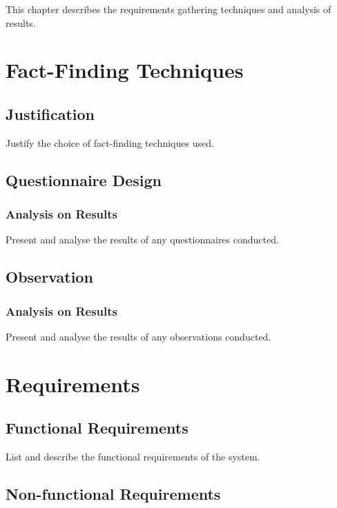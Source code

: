 \documentclass[
]{fypStandard}
\begin{document}
This chapter describes the requirements gathering techniques and
analysis of results.

\section{Fact-Finding Techniques}\label{fact-finding-techniques}

\subsection{Justification}\label{justification}

Justify the choice of fact-finding techniques used.

\subsection{Questionnaire Design}\label{questionnaire-design}

\subsubsection{Analysis on Results}\label{analysis-on-results}

Present and analyse the results of any questionnaires conducted.

\subsection{Observation}\label{observation}

\subsubsection{Analysis on Results}\label{analysis-on-results-1}

Present and analyse the results of any observations conducted.

\section{Requirements}\label{requirements}

\subsection{Functional Requirements}\label{functional-requirements}

List and describe the functional requirements of the system.

\subsection{Non-functional
Requirements}\label{non-functional-requirements}
\end{document}
